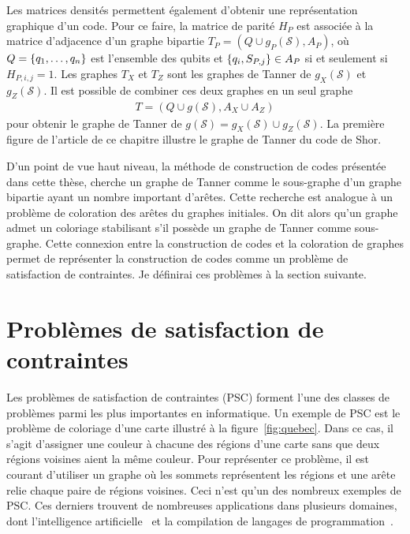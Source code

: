 Les matrices densités permettent également d'obtenir une représentation graphique d'un code.
Pour ce faire, la matrice de parité $H_P$ est associée à la matrice d'adjacence d'un
graphe bipartie $T_P = (Q \cup g_P(\mathcal S), A_P)$,
où $Q = \qty{q_1, \dots, q_n}$ est l'ensemble des qubits
et $\qty{q_i, S_{P, j}} \in A_P$ si et seulement si $H_{P, i, j} = 1$.
Les graphes $T_X$ et $T_Z$ sont les graphes de Tanner de $g_X(\mathcal S)$ et $g_Z(\mathcal S)$.
Il est possible de combiner ces deux graphes en un seul graphe
\begin{align}
  T = (Q \cup g(\mathcal S), A_X \cup A_Z)
\end{align}
pour obtenir le graphe de Tanner de $g(\mathcal S) = g_X(\mathcal S) \cup g_Z(\mathcal S)$.
La première figure de l'article de ce chapitre illustre le graphe de Tanner du code de Shor.

D'un point de vue haut niveau,
la méthode de construction de codes présentée dans cette thèse,
cherche un graphe de Tanner comme le sous-graphe d'un graphe bipartie
ayant un nombre important d'arêtes.
Cette recherche est analogue à un problème de coloration des arêtes du graphes initiales.
On dit alors qu'un graphe admet un coloriage stabilisant s'il possède un graphe de Tanner comme sous-graphe.
Cette connexion entre la construction de codes et la coloration de graphes permet 
de représenter la construction de codes comme un problème de satisfaction de contraintes.
Je définirai ces problèmes à la section suivante.

\section{Problèmes de satisfaction de contraintes}
\label{sec:csp}

Les problèmes de satisfaction de contraintes (PSC)
forment l'une des classes de problèmes parmi les plus importantes en informatique.
Un exemple de PSC est le problème de coloriage d'une carte illustré à la figure~\ref{fig:quebec}.
Dans ce cas,
il s'agit d'assigner une couleur à chacune des régions d'une carte sans que deux régions voisines 
aient la même couleur.
Pour représenter ce problème,
il est courant d'utiliser un graphe où les sommets représentent les régions et une arête relie
chaque paire de régions voisines.
Ceci n'est qu'un des nombreux exemples de PSC.
Ces derniers trouvent de nombreuses applications dans plusieurs domaines,
dont l'intelligence artificielle~\cite{russel_artificial_nodate}
et la compilation de langages de programmation~\cite{aho_compilers_2006}.

